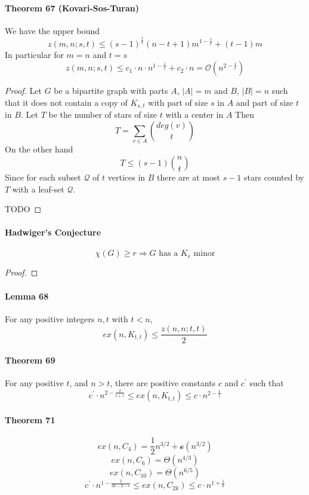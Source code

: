\paragraph{Theorem 67 (Kovari-Sos-Turan)} We have the upper bound 
$$ z(m,n;s,t) \leq (s - 1)^{\frac{1}{t}}(n-t+1)m^{1-\frac{1}{t}}
+ (t-1)m $$ 
In particular for $ m = n $ and $ t = s $
$$  z(m,n;s,t) \leq c_1 \cdot n \cdot n^{1-\frac{1}{t}} + c_2 \cdot n
= \mathcal{O}(n^{2-\frac{1}{t}}) $$ 
\begin{proof}
    Let $ G $ be a bipartite graph with parts $ A $, $ |A| = m$ and 
    $ B $, $|B| = n $ such that it does not contain a copy of $ K_{s,t} $
    with part of size $ s $ in $ A $ and part of size $ t $ in $ B $.
    Let $ T $ be the number of stars of size $ t $ with a center in $ A $
    Then 
    $$ T = \sum_{v \in A} \binom{deg(v)}{t} $$ 
    On the other hand 
    $$ T \leq (s - 1)\binom{n}{t} $$
    Since for each subset $ \mathcal{Q} $ of $ t $ vertices in $ B $ there 
    are at most $ s-1 $ stars counted by $ T $ with a leaf-set $ \mathcal{Q}$.

    \smallskip TODO
\end{proof}

\paragraph{Hadwiger's Conjecture}
$$  \chi(G) \geq r \Rightarrow G \text{ has  a } K_r \text{ minor}$$
\begin{proof}
    {\color{red}{proof cases $r = 3$ and $r = 4$ for exam}}
\end{proof}

\paragraph{Lemma 68} For any positive integers $ n,t $ with $ t < n$, 
$$ ex(n,K_{t,t}) \leq \frac{z(n,n;t,t)}{2} $$

\paragraph{Theorem 69} For any positive $ t$, and $ n > t $, there are 
positive constants $ c $ and $ c^\prime $ such that 
$$ c^\prime \cdot n^{2 -\frac{2}{t+1}} \leq ex(n,K_{t,t}) \leq c 
\cdot n^{2 - \frac{1}{t}} $$

\paragraph{Theorem 71} 
$$ ex(n,C_4) = \frac{1}{2}n^{3/2} + \mathcal{o}(n^{3/2}) $$ 
$$ ex(n,C_6) = \Theta(n^{4/3}) $$
$$ ex(n,C_{10}) = \Theta(n^{6/5}) $$ 
$$ c^\prime \cdot n^{1-\frac{2}{3k-2-\epsilon}} \leq 
ex(n,C_{2k}) \leq c \cdot n^{1 + \frac{1}{k}} $$ 

